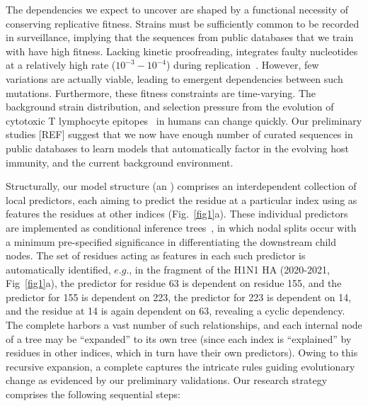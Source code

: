 \documentclass[onecolumn, compsoc,12pt]{IEEEtran}
\begin{document}
The dependencies we expect to uncover are shaped by  a  functional necessity of conserving replicative  fitness. Strains must be sufficiently common  to be recorded in surveillance, implying that the sequences from public databases that we train  with have  high  fitness. Lacking kinetic proofreading, \infl integrates  faulty nucleotides   at a relatively high rate ($10^{-3}-10^{-4}$) during  replication~\cite{ahlquist2002rna,chen2006avian}. However, few variations are actually viable, leading to emergent dependencies between such mutations. Furthermore, these fitness constraints are  time-varying. The background strain distribution, and selection pressure from the evolution of cytotoxic T lymphocyte  epitopes~\cite{woolthuis2016long,fan2012role,van2016differential,berkhoff2007assessment,van2012evasion} in humans can change quickly. Our preliminary studies [REF] suggest that we now have enough number of curated sequences in public databases to learn models that  %
  automatically factor in the evolving host immunity, and the current background environment.  

Structurally, our model structure (an \enet) comprises an interdependent collection of  local predictors, each aiming to predict the  residue at a particular index  using as features  the residues   at other  indices  (Fig.~\ref{fig1}a). These individual predictors are implemented as conditional inference trees~\cite{Hothorn06unbiasedrecursive}, in which  nodal splits  occur with  a minimum pre-specified significance in differentiating the  downstream child nodes. %
The set of residues acting as features in each such predictor is automatically identified, $e.g.$, in the fragment of the  H1N1 HA \enet (2020-2021, Fig~\ref{fig1}a), the predictor for residue 63 is dependent on   residue  155, and the predictor for  155 is dependent on  223, the predictor for  223 is dependent on  14, and the residue at  14 is again dependent on  63, revealing a cyclic dependency. The complete \enet harbors a vast number of such  relationships, and each internal node of a tree may be  ``expanded'' to its own tree (since each index is ``explained'' by residues in other indices, which in turn have their own predictors). Owing to this recursive expansion,  a complete \enet  captures the intricate rules guiding evolutionary change as evidenced by our preliminary validations. Our research strategy comprises the following sequential steps:
\end{document}
